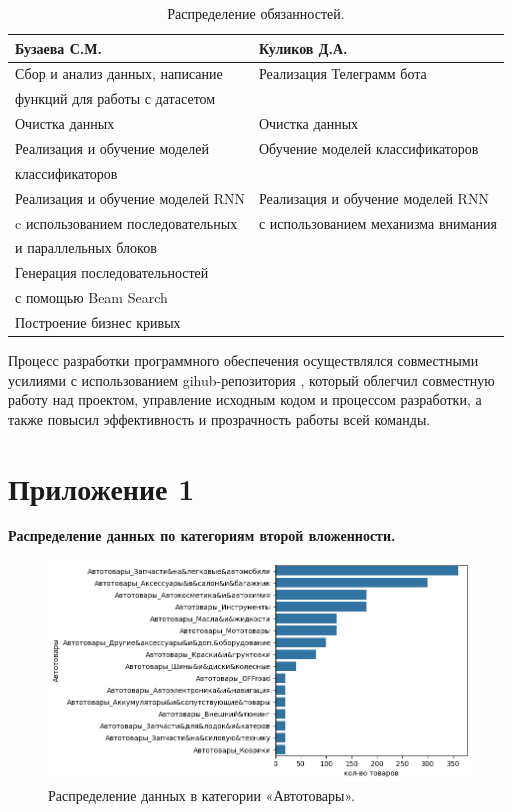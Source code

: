 \documentclass[a4paper,12pt]{extarticle}
\begin{document}
\begin{table}[h]
	\centering
	\begin{tabular}{ |l|l| } 
		\hline
		\textbf{Бузаева С.М.} & \textbf{Куликов Д.А.}  \\ \hline
		Сбор и анализ данных, написание & Реализация Телеграмм бота \\
		функций для работы с датасетом & \\ \hline
		Очистка данных & Очистка данных \\ \hline
		Реализация и обучение моделей  & Обучение моделей  классификаторов\\ 
		классификаторов  & \\ \hline
		Реализация и обучение моделей RNN & Реализация и обучение моделей RNN \\
		c использованием последовательных & с использованием механизма внимания \\
		и параллельных блоков &  \\ \hline
		Генерация последовательностей &  \\ 
		с помощью Beam Search  &  \\ \hline
		Построение бизнес кривых  &  \\  
		\hline
	\end{tabular}
	\caption{Распределение обязанностей.}
	\label{work}
\end{table}

Процесс разработки программного обеспечения осуществлялся совместными усилиями с использованием gihub-репозитория \cite{github}, который облегчил совместную работу над проектом, управление исходным кодом и процессом разработки, а также повысил эффективность и прозрачность работы всей команды.

\newpage
\nocite{*}
\printbibliography[heading=bibintoc]

\newpage
\appendix

\section{Приложение 1}
\label{appendix:amount_of_categor2}
\textbf{\large{Распределение данных по категориям второй вложенности.}}

\begin{figure}[hbtp]
	\centering
	\includegraphics[scale=0.8]{приложения/amount_of_category_Автотовары.png}
	\caption{Распределение данных в категории «Автотовары».}
	\label{fig:amount_of_category_Автотовары}
\end{figure}
\end{document}
